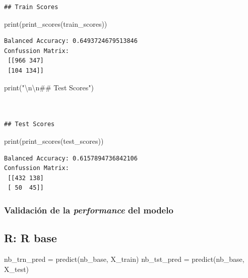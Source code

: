 \documentclass[
  letterpaper,
  DIV=11,
  numbers=noendperiod]{scrartcl}
\newenvironment{Shaded}{\begin{snugshade}}{\end{snugshade}}
\newcommand{\BuiltInTok}[1]{\textcolor[rgb]{0.00,0.23,0.31}{#1}}
\newcommand{\CharTok}[1]{\textcolor[rgb]{0.13,0.47,0.30}{#1}}
\newcommand{\FunctionTok}[1]{\textcolor[rgb]{0.28,0.35,0.67}{#1}}
\newcommand{\NormalTok}[1]{\textcolor[rgb]{0.00,0.23,0.31}{#1}}
\newcommand{\OtherTok}[1]{\textcolor[rgb]{0.00,0.23,0.31}{#1}}
\newcommand{\StringTok}[1]{\textcolor[rgb]{0.13,0.47,0.30}{#1}}
\begin{document}
\begin{verbatim}
## Train Scores
\end{verbatim}

\begin{Shaded}
\begin{Highlighting}[]
\BuiltInTok{print}\NormalTok{(print\_scores(train\_scores))}
\end{Highlighting}
\end{Shaded}

\begin{verbatim}
Balanced Accuracy: 0.6493724679513846
Confussion Matrix:
 [[966 347]
 [104 134]]
\end{verbatim}

\begin{Shaded}
\begin{Highlighting}[]
\BuiltInTok{print}\NormalTok{(}\StringTok{"}\CharTok{\textbackslash{}n\textbackslash{}n}\StringTok{\#\# Test Scores"}\NormalTok{)}
\end{Highlighting}
\end{Shaded}

\begin{verbatim}


## Test Scores
\end{verbatim}

\begin{Shaded}
\begin{Highlighting}[]
\BuiltInTok{print}\NormalTok{(print\_scores(test\_scores))}
\end{Highlighting}
\end{Shaded}

\begin{verbatim}
Balanced Accuracy: 0.6157894736842106
Confussion Matrix:
 [[432 138]
 [ 50  45]]
\end{verbatim}

\subsubsection{\texorpdfstring{Validación de la \emph{performance} del
modelo}{Validación de la performance del modelo}}\label{validaciuxf3n-de-la-performance-del-modelo-1}

\subsection{R: R base}

\begin{Shaded}
\begin{Highlighting}[]
\NormalTok{nb\_trn\_pred }\OtherTok{=} \FunctionTok{predict}\NormalTok{(nb\_base, X\_train)}
\NormalTok{nb\_tst\_pred }\OtherTok{=} \FunctionTok{predict}\NormalTok{(nb\_base, X\_test)}
\end{Highlighting}
\end{Shaded}
\end{document}
